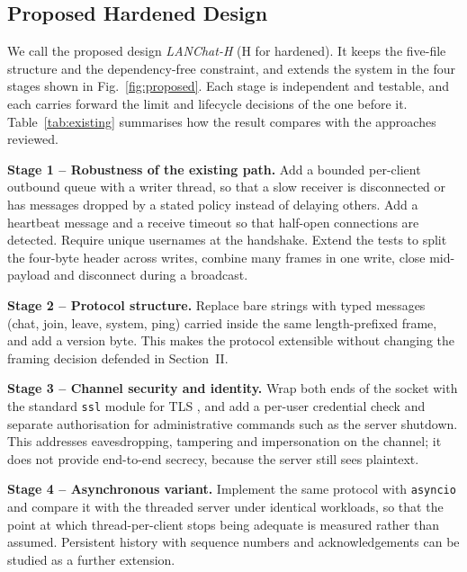 \documentclass[conference]{IEEEtran}
\newcommand{\code}[1]{\texttt{#1}}
\begin{document}
\subsection{Proposed Hardened Design}
We call the proposed design \emph{LANChat-H} (H for hardened). It keeps the five-file structure and the dependency-free constraint, and extends the system in the four stages shown in Fig.~\ref{fig:proposed}. Each stage is independent and testable, and each carries forward the limit and lifecycle decisions of the one before it. Table~\ref{tab:existing} summarises how the result compares with the approaches reviewed.

\textbf{Stage 1 -- Robustness of the existing path.} Add a bounded per-client outbound queue with a writer thread, so that a slow receiver is disconnected or has messages dropped by a stated policy instead of delaying others. Add a heartbeat message and a receive timeout so that half-open connections are detected. Require unique usernames at the handshake. Extend the tests to split the four-byte header across writes, combine many frames in one write, close mid-payload and disconnect during a broadcast.

\textbf{Stage 2 -- Protocol structure.} Replace bare strings with typed messages (chat, join, leave, system, ping) carried inside the same length-prefixed frame, and add a version byte. This makes the protocol extensible without changing the framing decision defended in Section~II.

\textbf{Stage 3 -- Channel security and identity.} Wrap both ends of the socket with the standard \code{ssl} module for TLS \cite{rfc8446,pyssl}, and add a per-user credential check and separate authorisation for administrative commands such as the server shutdown. This addresses eavesdropping, tampering and impersonation on the channel; it does not provide end-to-end secrecy, because the server still sees plaintext.

\textbf{Stage 4 -- Asynchronous variant.} Implement the same protocol with \code{asyncio} \cite{pyasyncio} and compare it with the threaded server under identical workloads, so that the point at which thread-per-client stops being adequate is measured rather than assumed. Persistent history with sequence numbers and acknowledgements can be studied as a further extension.
\end{document}
